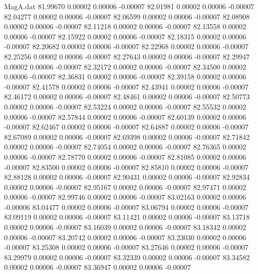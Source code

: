 \begin{filecontents}{MagA.dat}
  81.99670    0.00002    0.00006   -0.00007
  82.01981    0.00002    0.00006   -0.00007
  82.04277    0.00002    0.00006   -0.00007
  82.06599    0.00002    0.00006   -0.00007
  82.08908    0.00002    0.00006   -0.00007
  82.11218    0.00002    0.00006   -0.00007
  82.13558    0.00002    0.00006   -0.00007
  82.15922    0.00002    0.00006   -0.00007
  82.18315    0.00002    0.00006   -0.00007
  82.20682    0.00002    0.00006   -0.00007
  82.22968    0.00002    0.00006   -0.00007
  82.25256    0.00002    0.00006   -0.00007
  82.27643    0.00002    0.00006   -0.00007
  82.29947    0.00002    0.00006   -0.00007
  82.32172    0.00002    0.00006   -0.00007
  82.34500    0.00002    0.00006   -0.00007
  82.36831    0.00002    0.00006   -0.00007
  82.39158    0.00002    0.00006   -0.00007
  82.41578    0.00002    0.00006   -0.00007
  82.43941    0.00002    0.00006   -0.00007
  82.46172    0.00002    0.00006   -0.00007
  82.48461    0.00002    0.00006   -0.00007
  82.50773    0.00002    0.00006   -0.00007
  82.53224    0.00002    0.00006   -0.00007
  82.55532    0.00002    0.00006   -0.00007
  82.57844    0.00002    0.00006   -0.00007
  82.60139    0.00002    0.00006   -0.00007
  82.62467    0.00002    0.00006   -0.00007
  82.64887    0.00002    0.00006   -0.00007
  82.67089    0.00002    0.00006   -0.00007
  82.69398    0.00002    0.00006   -0.00007
  82.71842    0.00002    0.00006   -0.00007
  82.74054    0.00002    0.00006   -0.00007
  82.76365    0.00002    0.00006   -0.00007
  82.78770    0.00002    0.00006   -0.00007
  82.81085    0.00002    0.00006   -0.00007
  82.83500    0.00002    0.00006   -0.00007
  82.85810    0.00002    0.00006   -0.00007
  82.88128    0.00002    0.00006   -0.00007
  82.90431    0.00002    0.00006   -0.00007
  82.92834    0.00002    0.00006   -0.00007
  82.95167    0.00002    0.00006   -0.00007
  82.97471    0.00002    0.00006   -0.00007
  82.99746    0.00002    0.00006   -0.00007
  83.02163    0.00002    0.00006   -0.00006
  83.04477    0.00002    0.00006   -0.00007
  83.06794    0.00002    0.00006   -0.00007
  83.09119    0.00002    0.00006   -0.00007
  83.11421    0.00002    0.00006   -0.00007
  83.13718    0.00002    0.00006   -0.00007
  83.16039    0.00002    0.00006   -0.00007
  83.18342    0.00002    0.00006   -0.00007
  83.20742    0.00002    0.00006   -0.00007
  83.23030    0.00002    0.00006   -0.00007
  83.25308    0.00002    0.00006   -0.00007
  83.27646    0.00002    0.00006   -0.00007
  83.29979    0.00002    0.00006   -0.00007
  83.32339    0.00002    0.00006   -0.00007
  83.34582    0.00002    0.00006   -0.00007
  83.36947    0.00002    0.00006   -0.00007

\end{filecontents}
